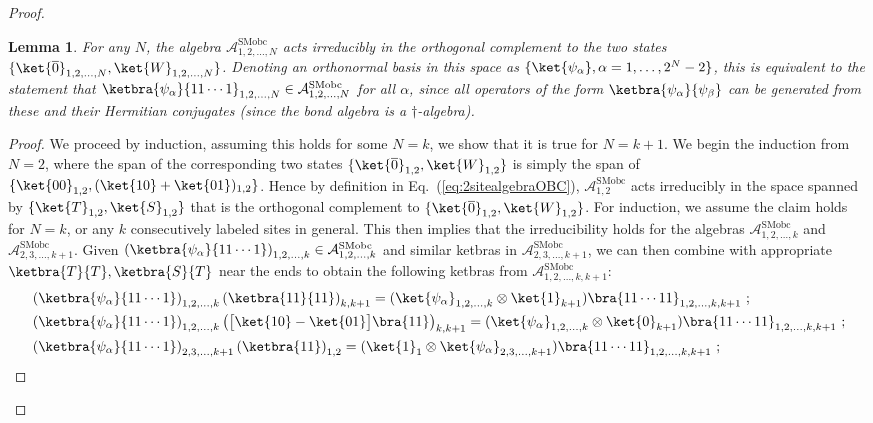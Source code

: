 \documentclass[prx,letterpaper,aps,superscriptaddress,floatfix,twocolumn,nofootinbib]{revtex4-2}
\newtheorem{lemma}{Lemma}
\theoremstyle{definition}
\newcommand{\mA}{\mathcal{A}}
\newcommand{\ktO}{\ket{\overline{0}}}
\newcommand{\ktW}{\ket{W}}
\begin{document}
\begin{proof}
%
\begin{lemma}\label{lem:OBC}
For any $N$, the algebra $\mA_{1,2,\dots,N}^\text{SMobc}$ acts irreducibly in the orthogonal complement to the two states $\{ \ktO_{1,2,\dots,N}, \ktW_{1,2,\dots,N} \}$.
%
Denoting an orthonormal basis in this space as $\{ \ket{\psi_\alpha}, \alpha = 1, \dots, 2^N-2 \}$, this is equivalent to the statement that $\ketbra{\psi_\alpha}{11 \cdots 1}_{1,2,\dots,N} \in \mA_{1,2,\dots,N}^\text{SMobc}$ for all $\alpha$, since all operators of the form $\ketbra{\psi_\alpha}{\psi_\beta}$ can be generated from these and their Hermitian conjugates (since the bond algebra is a $\dagger$-algebra). 
%
\end{lemma}
%
\begin{proof}
%
We proceed by induction, assuming this holds for some $N = k$, we show that it is true for $N = k + 1$.
%
We begin the induction from $N = 2$, where the span of the corresponding two states $\{ \ktO_{1,2}, \ktW_{1,2} \}$ is simply the span of $\{ \ket{00}_{1,2}, (\ket{10} + \ket{01})_{1,2} \}$.
%
Hence by definition in Eq.~(\ref{eq:2sitealgebraOBC}), $\mA_{1,2}^\text{SMobc}$ acts irreducibly in the space spanned by $\{ \ket{T}_{1,2}, \ket{S}_{1,2} \}$ that is the orthogonal complement to $\{ \ktO_{1,2}, \ktW_{1,2} \}$.
%
For induction, we assume the claim holds for $N = k$, or any $k$ consecutively labeled sites in general.
%
This then implies that the irreducibility holds for the algebras $\mA_{1,2,\dots,k}^\text{SMobc}$ and $\mA_{2,3,\dots,k+1}^\text{SMobc}$.
%
Given $\left(\ketbra{\psi_\alpha}{11 \cdots 1} \right)_{1,2,\dots,k} \in \mA_{1,2,\dots,k}^\text{SMobc}$ and similar ketbras in $\mA_{2,3,\dots,k+1}^\text{SMobc}$, we can then combine with appropriate $\ketbra{T}{T}, \ketbra{S}{T}$ near the ends to obtain the following ketbras from $\mA_{1,2,\dots,k,k+1}^\text{SMobc}$:
\begin{align*}
& \left(\ketbra{\psi_\alpha}{11 \cdots 1} \right)_{1,2,\dots,k} \left(\ketbra{11}{11} \right)_{k,k+1} = (\ket{\psi_\alpha}_{1,2,\dots,k} \otimes \ket{1}_{k+1}) \bra{11 \cdots 11}_{1,2,\dots,k,k+1} ~; \\
& \left(\ketbra{\psi_\alpha}{11 \cdots 1} \right)_{1,2,\dots,k} \left(\big[\ket{10} - \ket{01} \big] \bra{11} \right)_{k,k+1} = (\ket{\psi_\alpha}_{1,2,\dots,k} \otimes \ket{0}_{k+1}) \bra{11\cdots 11}_{1,2,\dots,k,k+1} ~; \\
& \left(\ketbra{\psi_\alpha}{11 \cdots 1} \right)_{2,3,\dots,k+1} \left(\ketbra{11} \right)_{1,2} = (\ket{1}_1 \otimes \ket{\psi_\alpha}_{2,3,\dots,k+1}) \bra{11 \cdots 11}_{1,2,\dots,k,k+1} ~; \\

\end{align*}
\end{proof}
\end{proof}
\end{document}
